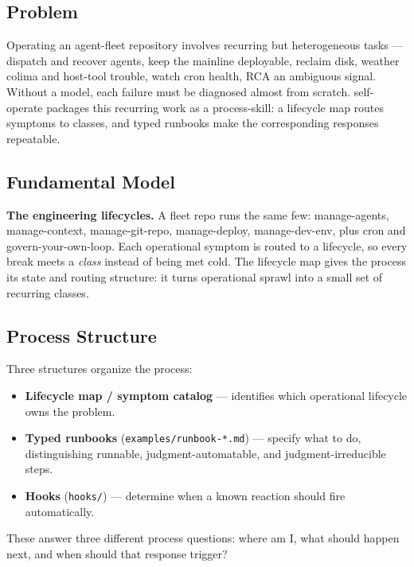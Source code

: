 \subsection{Problem}\label{heading:problem-2}

Operating an agent-fleet repository involves recurring but heterogeneous tasks --- dispatch and recover agents, keep the mainline deployable, reclaim disk, weather colima and host-tool trouble, watch cron health, RCA an ambiguous signal. Without a model, each failure must be diagnosed almost from scratch. self-operate packages this recurring work as a process-skill: a lifecycle map routes symptoms to classes, and typed runbooks make the corresponding responses repeatable.

\subsection{Fundamental Model}\label{heading:fundamental-model-2}

\textbf{The engineering lifecycles.} A fleet repo runs the same few: manage-agents, manage-context, manage-git-repo, manage-deploy, manage-dev-env, plus cron and govern-your-own-loop. Each operational symptom is routed to a lifecycle, so every break meets a \emph{class} instead of being met cold. The lifecycle map gives the process its state and routing structure: it turns operational sprawl into a small set of recurring classes.

\subsection{Process Structure}\label{heading:process-structure}

Three structures organize the process:

\begin{itemize}
\tightlist
\item
  \textbf{Lifecycle map / symptom catalog} --- identifies which operational lifecycle owns the problem.
\item
  \textbf{Typed runbooks} (\texttt{examples/runbook-*.md}) --- specify what to do, distinguishing runnable, judgment-automatable, and judgment-irreducible steps.
\item
  \textbf{Hooks} (\texttt{hooks/}) --- determine when a known reaction should fire automatically.
\end{itemize}

These answer three different process questions: where am I, what should happen next, and when should that response trigger?

